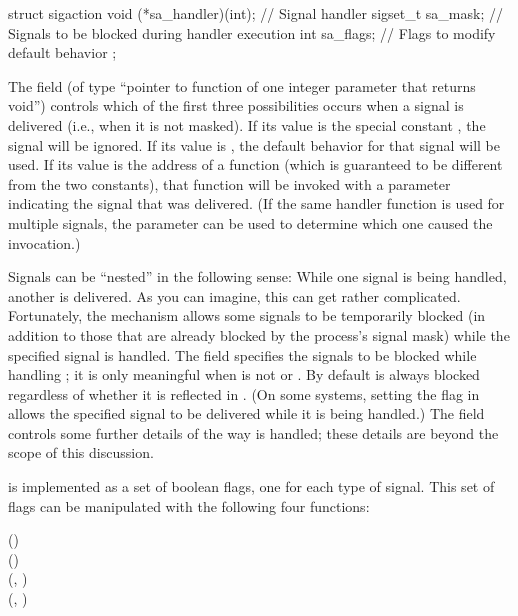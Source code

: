 \label{page:sigactionstruct}
\begin{inlinecode}
struct sigaction {
    void (*sa_handler)(int);  // Signal handler
    sigset_t sa_mask;         // Signals to be blocked during handler execution
    int sa_flags;             // Flags to modify default behavior
};
\end{inlinecode}

The field  (of type ``pointer to function of
one integer parameter that returns void'') controls
which of the first three possibilities occurs when
a signal is delivered (i.e., when it is not masked).
If its value is the special constant ,
the signal will be ignored.  If its value is , the
default behavior for that signal will be used.
If its value is the address of a function (which
is guaranteed to be different from the two constants),
that function will be invoked with a parameter indicating the signal
that was delivered.  (If the same
handler function is used for multiple signals, the parameter
can be used to determine which one  caused the invocation.)

Signals can be ``nested'' in the following sense:
While one signal is being handled, another is delivered.
As you can imagine, this can get rather complicated.
Fortunately, the  mechanism allows
some signals to be temporarily blocked (in addition to those that are
already blocked by the process's signal mask) while the specified signal is
handled.
The field  specifies the
signals to be blocked while 
handling ; it is only meaningful when
 is not  or
.  By default  is always
blocked regardless of whether it is reflected in
. (On some systems, setting 
the flag  in 
allows the specified signal to be delivered while it is being handled.)
The  field controls some further details of the
way  is handled; these details are beyond the scope of this
discussion.

 is implemented as a set of boolean flags, one for
each type of signal.  This set of flags can be manipulated with the following
four functions:

\begin{inlinefcn}
 ()\\
 ()\\
 (,  )\\
 (,  )
\end{inlinefcn}

